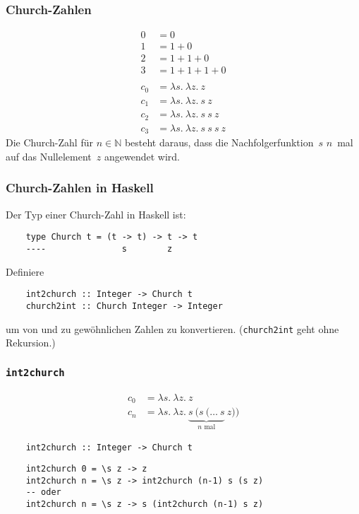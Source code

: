 \documentclass{beamer}
\date{2016-11-28/29}
\begin{document}
\normalsize
\normalem

\begin{frame}[plain]
  \titlepage
\end{frame}

\begin{frame}
  \frametitle{Church-Zahlen}
  \begin{align*}
    0 &= 0 \\
    1 &= 1 + 0 \\
    2 &= 1 + 1 + 0 \\
    3 &= 1 + 1 + 1 + 0 \\
    \\
    c_0 &= λs.~λz.~z \\
    c_1 &= λs.~λz.~s~z \\
    c_2 &= λs.~λz.~s~s~z \\
    c_3 &= λs.~λz.~s~s~s~z
  \end{align*}
  Die Church-Zahl für $n∈ℕ$ besteht daraus, dass die Nachfolgerfunktion~$s$ $n$~mal auf das Nullelement~$z$ angewendet wird.
\end{frame}

\begin{frame}[fragile]
  \frametitle{Church-Zahlen in Haskell}
  Der Typ einer Church-Zahl in Haskell ist:
  \begin{lstlisting}
    type Church t = (t -> t) -> t -> t
    ----               s        z
  \end{lstlisting}
  Definiere
  \begin{lstlisting}
    int2church :: Integer -> Church t
    church2int :: Church Integer -> Integer
  \end{lstlisting}
  um von und zu gewöhnlichen Zahlen zu konvertieren.
  (\lstinline{church2int} geht ohne Rekursion.)
\end{frame}

\begin{frame}[fragile]
  \frametitle{\lstinline{int2church}}
  \begin{align*}
    c_0 &= λs.~λz.~z \\
    c_n &= λs.~λz.~\underbrace{s~(s~(\ldots~s}_{\text{$n$ mal}}~z))
  \end{align*}
  \begin{lstlisting}
    int2church :: Integer -> Church t
  \end{lstlisting}
  \pause
  \begin{lstlisting}
    int2church 0 = \s z -> z
    int2church n = \s z -> int2church (n-1) s (s z)
    -- oder
    int2church n = \s z -> s (int2church (n-1) s z)
  \end{lstlisting}
\end{frame}
\end{document}
